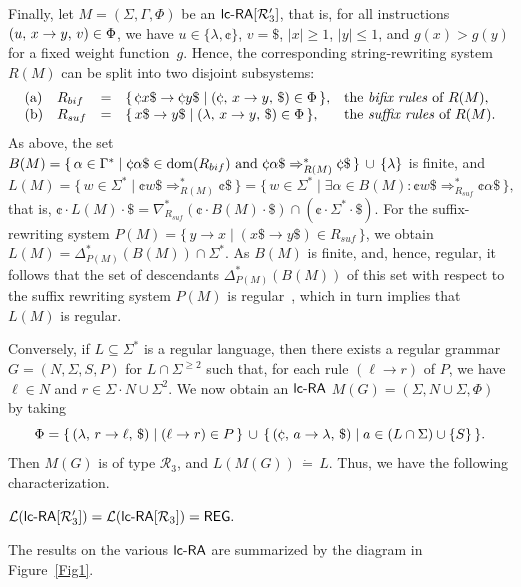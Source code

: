 Finally, let $M = (\Sigma,\Gamma,\Phi)$ be an $\lcRA[3']$, that is, for all instructions $(u,\,x\rightarrow y,\,v)\in \Phi$, we have $u\in\{\lambda,\cent\}$, $v=\$$, $|x|\ge 1$, $|y|\le 1$, and $g(x)>g(y)$ for a fixed weight function~$g$. Hence, the corresponding string-rewriting system $R(M)$ can be split into two disjoint subsystems:
$$\begin{array}{llcll}
{\rm (a)} & R_{bif} & = & \{\,\cent x\$ \to \cent y\$ \mid \rarule{\cent}{x}{y}{\$}\in \Phi\,\}, & \textup{the \emph{bifix rules} of }R(M),\\
{\rm (b)} & R_{suf}& = & \{\,x\$ \to y\$ \mid \rarule{\lambda}{x}{y}{\$}\in \Phi\,\}, & \textup{the \emph{suffix rules} of }R(M).\\
\end{array}$$
As above, the set $B(M) = \{\,\alpha\in\Gamma^*\mid \cent \alpha\$\in {\rm dom}(R_{bif}) \textup{ and } \cent \alpha\$\Rightarrow_{R(M)}^* \cent \$\,\}\,\cup\,\{\lambda\}$ is finite, and
$$
L(M)  =  \{\,w\in\Sigma^*\mid \cent w\$\Rightarrow_{R(M)}^*\cent\$\,\}
      =  \{\,w\in\Sigma^*\mid \exists \alpha\in B(M):\cent w\$\Rightarrow_{R_{suf}}^* \cent\alpha\$\,\},
$$
that is, $\cent\cdot L(M) \cdot \$ = \nabla_{R_{suf}}^*(\cent\cdot B(M)\cdot\$) \cap (\cent\cdot\Sigma^*\cdot\$).$ For the suffix-rewriting system $P(M) = \{\,y\to x\mid (x\$\to y\$)\in R_{suf}\,\}$, we obtain $L(M) = \Delta_{P(M)}^*(B(M))\cap\Sigma^*.$ As $B(M)$ is finite, and, hence, regular, it follows that the set of descendants $\Delta_{P(M)}^*(B(M))$ of this set with respect to the suffix rewriting system $P(M)$ is regular~\cite{Buc64}, which in turn implies that $L(M)$ is regular.

Conversely, if $L\subseteq\Sigma^*$ is a regular language, then there exists a regular grammar $G=(N,\Sigma,S,P)$ for $L\cap\Sigma^{\ge 2}$ such that, for each rule $(\ell\to r)$ of $P$, we have $\ell\in N$ and $r\in \Sigma\cdot N \cup \Sigma^2$. We now obtain an $\lcRA$ $M(G)=(\Sigma,N\cup\Sigma,\Phi)$ by taking
$$\Phi = \{\,\rarule{\lambda}{r}{\ell}{\$}\mid (\ell\to r)\in P\,\}\,\cup\,
         \{\,\rarule{\cent}{a}{\lambda}{\$}\mid a\in(L\cap\Sigma)\cup\{S\}\,\}.$$
Then $M(G)$ is of type $\mathcal{R}_3$, and $L(M(G))\,\dot{=}\,L$. Thus, we have the following characterization.
\begin{theorem}\label{PropR3}
${\mathcal L}(\lcRAp[3]) = {\mathcal L}(\lcRA[3]) = \REG.$
\end{theorem}

The results on the various $\lcRA$ are summarized by the diagram in Figure~\ref{Fig1}.

